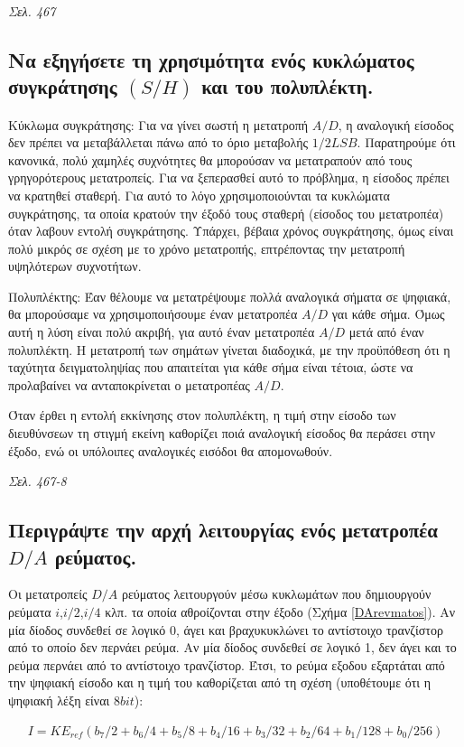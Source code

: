 \documentclass{article}
\begin{document}
\emph{Σελ. 467}

\subsection{Να εξηγήσετε τη χρησιμότητα ενός κυκλώματος συγκράτησης $(S/H)$ και του πολυπλέκτη.}
Κύκλωμα συγκράτησης: Για να γίνει σωστή η μετατροπή $A/D$, η αναλογική είσοδος δεν πρέπει να μεταβάλλεται πάνω από το όριο μεταβολής $1/2LSB$. Παρατηρούμε ότι κανονικά,
πολύ χαμηλές συχνότητες θα μπορούσαν να μετατραπούν από τους γρηγορότερους μετατροπείς. Για να ξεπερασθεί αυτό το πρόβλημα, η είσοδος πρέπει να κρατηθεί σταθερή. Για
αυτό το λόγο χρησιμοποιούνται τα κυκλώματα συγκράτησης, τα οποία κρατούν την έξοδό τους σταθερή (είσοδος του μετατροπέα) όταν λαβουν εντολή συγκράτησης. Υπάρχει, 
βέβαια χρόνος συγκράτησης, όμως είναι πολύ μικρός σε σχέση με το χρόνο μετατροπής, επτρέποντας την μετατροπή υψηλότερων συχνοτήτων.

Πολυπλέκτης: Έαν θέλουμε να μετατρέψουμε πολλά αναλογικά σήματα σε ψηφιακά, θα μπορούσαμε να χρησιμοποιήσουμε έναν μετατροπέα $A/D$ γαι κάθε σήμα. Όμως αυτή η λύση είναι
πολύ ακριβή, για αυτό έναν μετατροπέα $A/D$ μετά από έναν πολυπλέκτη. Η μετατροπή των σημάτων γίνεται διαδοχικά, με την προϋπόθεση ότι η ταχύτητα δειγματοληψίας που
απαιτείται για κάθε σήμα είναι τέτοια, ώστε να προλαβαίνει να ανταποκρίνεται ο μετατροπέας $A/D$.

Όταν έρθει η εντολή εκκίνησης στον πολυπλέκτη, η τιμή στην είσοδο των διευθύνσεων τη στιγμή εκείνη καθορίζει ποιά αναλογική είσοδος θα περάσει στην έξοδο, ενώ οι 
υπόλοιπες αναλογικές εισόδοι θα απομονωθούν.

\emph{Σελ. 467-8}

\subsection{Περιγράψτε την αρχή λειτουργίας ενός μετατροπέα $D/A$ ρεύματος.}
Οι μετατροπείς $D/A$ ρεύματος λειτουργούν μέσω κυκλωμάτων που δημιουργούν ρεύματα $i$,$i/2$,$i/4$ κλπ. τα οποία αθροίζονται στην έξοδο (Σχήμα \ref{DArevmatos}). Αν μία δίοδος συνδεθεί σε λογικό 0, άγει και 
βραχυκυκλώνει το αντίστοιχο τρανζίστορ από το οποίο δεν περνάει ρεύμα. Αν μία δίοδος συνδεθεί σε λογικό 1, δεν άγει και το ρεύμα περνάει από το αντίστοιχο τρανζίστορ. Έτσι, το 
ρεύμα εξοδου εξαρτάται από την ψηφιακή είσοδο και η τιμή του καθορίζεται από τη σχέση (υποθέτουμε ότι η ψηφιακή λέξη είναι $8 bit$):

\begin{align*}
    I = K E_{ref} \left( b_7/2 + b_6/4 + b_5/8 + b_4/16 +b_3/32 + b_2/64 + b_1/128 + b_0/256 \right)
\end{align*}
\end{document}
